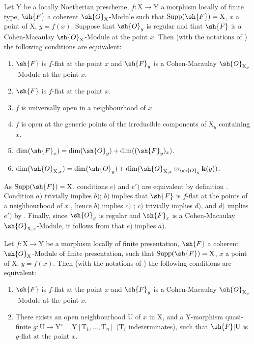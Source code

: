 \begin{proposition}[15.4.2]
\label{IV.15.4.2}
Let $\mathrm{Y}$ be a locally Noetherian prescheme, $f:\mathrm{X}\to\mathrm{Y}$ a morphism locally of finite type, $\sh{F}$ a coherent $\sh{O}_\mathrm{X}$-Module such that $\operatorname{Supp}(\sh{F})=\mathrm{X}$, $x$ a point of $\mathrm{X}$, $y=f(x)$.
Suppose that $\sh{O}_y$ is regular and that $\sh{F}$ is a Cohen-Macaulay $\sh{O}_\mathrm{X}$-Module at the point $x$.
Then (with the notations of ) the following conditions are equivalent:
\begin{enumerate}[label=\emph{\alph*})]
  \item $\sh{F}$ is $f$-flat at the point $x$ and $\sh{F}_y$ is a Cohen-Macaulay $\sh{O}_{\mathrm{X}_y}$-Module at the point $x$.
  \item $\sh{F}$ is $f$-flat at the point $x$.
  \item $f$ is universally open in a neighbourhood of $x$.
  \item $f$ is open at the generic points of the irreducible components of $\mathrm{X}_y$ containing $x$.
  \item $\dim(\sh{F}_x)=\dim(\sh{O}_y)+\dim((\sh{F}_y)_x)$.
  \item[\emph{e}$'$)] $\dim(\sh{O}_{\mathrm{X},x})=\dim(\sh{O}_y)+\dim(\sh{O}_{\mathrm{X},x}\otimes_{\sh{O}_y}\mathbf{k}(y))$.
\end{enumerate}
As $\operatorname{Supp}(\sh{F})=\mathrm{X}$, conditions $e)$ and $e')$ are equivalent by definition .
Condition $a)$ trivially implies $b)$; $b)$ implies that $\sh{F}$ is $f$-flat at the points of a neighbourhood of $x$ , hence $b)$ implies $c)$ ; $c)$ trivially implies $d)$, and $d)$ implies $e')$ by .
Finally, since $\sh{O}_y$ is regular and $\sh{F}_x$ is a Cohen-Macaulay $\sh{O}_{\mathrm{X},x}$-Module, it follows from  that $e)$ implies $a)$.
\end{proposition}

\begin{proposition}[15.4.3]
\label{IV.15.4.3}
Let $f:\mathrm{X}\to\mathrm{Y}$ be a morphism locally of finite presentation, $\sh{F}$ a coherent $\sh{O}_\mathrm{X}$-Module of finite presentation, such that $\operatorname{Supp}(\sh{F})=\mathrm{X}$, $x$ a point of $\mathrm{X}$, $y=f(x)$.
Then (with the notations of ) the following conditions are equivalent:
\begin{enumerate}[label=\emph{\alph*})]
  \item $\sh{F}$ is $f$-flat at the point $x$ and $\sh{F}_y$ is a Cohen-Macaulay $\sh{O}_{\mathrm{X}_y}$-Module at the point $x$.
  \item There exists an open neighbourhood $\mathrm{U}$ of $x$ in $\mathrm{X}$, and a $\mathrm{Y}$-morphism quasi-finite $g:\mathrm{U}\to\mathrm{Y}'=\mathrm{Y}[\mathrm{T}_1,\ldots,\mathrm{T}_n]$ ($\mathrm{T}_i$ indeterminates), such that $\sh{F}|\mathrm{U}$ is $g$-flat at the point $x$.
\end{enumerate}
\end{proposition}


